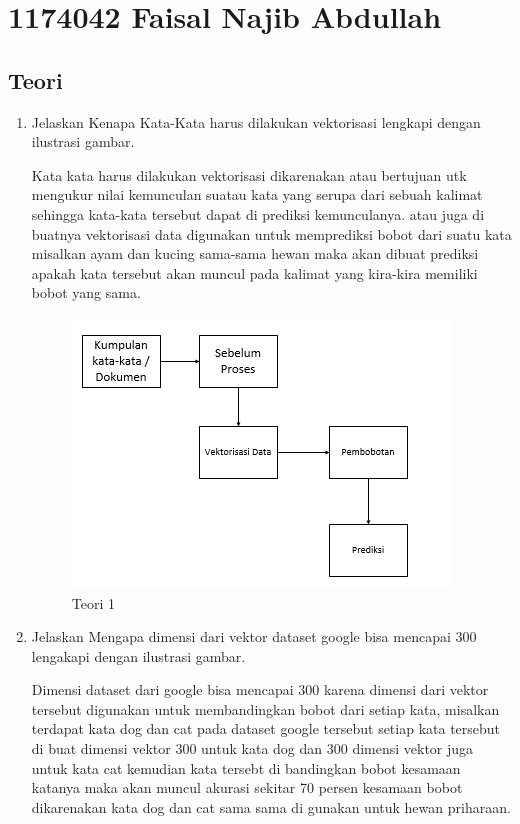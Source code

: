 \section{1174042 Faisal Najib Abdullah}

\subsection{Teori}
\begin{enumerate}

\item Jelaskan Kenapa Kata-Kata harus dilakukan vektorisasi lengkapi dengan ilustrasi gambar.\par
Kata kata harus dilakukan vektorisasi dikarenakan atau bertujuan utk mengukur nilai kemunculan suatau kata yang serupa dari sebuah kalimat sehingga kata-kata tersebut dapat di prediksi kemunculanya. atau juga di buatnya vektorisasi data digunakan untuk memprediksi bobot dari suatu kata misalkan ayam dan kucing sama-sama hewan maka akan dibuat prediksi apakah kata tersebut akan muncul pada kalimat yang kira-kira memiliki bobot yang sama.

\begin{figure}[ht]
\centering
\includegraphics[scale=0.6]{figures/1174042/chapter5/1,1.PNG}
\caption{Teori 1}
\label{contoh}
\end{figure}

\item Jelaskan Mengapa dimensi dari vektor dataset google bisa mencapai 300 lengakapi dengan ilustrasi gambar. \par
Dimensi dataset dari google bisa mencapai 300 karena dimensi dari vektor tersebut digunakan untuk membandingkan bobot dari setiap kata, misalkan terdapat kata dog dan cat pada dataset google tersebut setiap kata tersebut di buat dimensi vektor 300 untuk kata dog dan 300 dimensi vektor juga untuk kata cat kemudian kata tersebt di bandingkan bobot kesamaan katanya maka akan muncul akurasi sekitar 70 persen kesamaan bobot dikarenakan kata dog dan cat sama sama di gunakan untuk hewan priharaan.


\end{enumerate}
